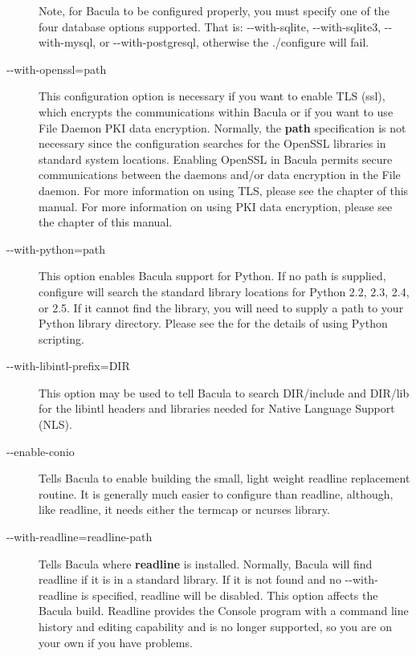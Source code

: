 \begin{description}
   Note, for Bacula to be configured properly, you must specify one
   of the four database options supported.  That is:
   {-}{-}with-sqlite, {-}{-}with-sqlite3, {-}{-}with-mysql, or
   {-}{-}with-postgresql, otherwise the ./configure will fail.

\item [ {-}{-}with-openssl=\lt{}path\gt{}]
   This configuration option is necessary if you want to enable TLS (ssl),
   which encrypts the communications within       
   Bacula or if you want to use File Daemon PKI data encryption.
   Normally, the {\bf path} specification is not necessary since
   the configuration searches for the OpenSSL libraries in standard system
   locations. Enabling OpenSSL in Bacula permits secure communications
   between the daemons and/or data encryption in the File daemon.
   For more information on using TLS, please see the
    chapter
   of this manual.
   For more information on using PKI data encryption, please see the
   chapter of this manual.

\item [ {-}{-}with-python=\lt{}path\gt{}]
   This option enables Bacula support for Python.  If no path is supplied,
   configure will search the standard library locations for Python 2.2,
   2.3, 2.4, or 2.5.  If it cannot find the library, you will need to
   supply a path to your Python library directory.  Please see the
    for the details of using Python
   scripting.

\item [ {-}{-}with-libintl-prefix=\lt{}DIR\gt{}]
   This option may be used to tell Bacula to search DIR/include and
   DIR/lib for the libintl headers and libraries needed for Native
   Language Support (NLS).

\item [ {-}{-}enable-conio]
   Tells Bacula to enable building the small, light weight readline
   replacement routine.  It is generally much easier to configure than
   readline, although, like readline, it needs either the termcap or
   ncurses library.

\item [ {-}{-}with-readline=\lt{}readline-path\gt{}]
   Tells Bacula where {\bf readline} is installed.  Normally, Bacula will
   find readline if it is in a standard library.  If it is not found and no
   {-}{-}with-readline is specified, readline will be disabled.  This
   option affects the Bacula build.  Readline provides the Console program
   with a command line history and editing capability and is no longer
   supported, so you are on your own if you have problems.


\end{description}
